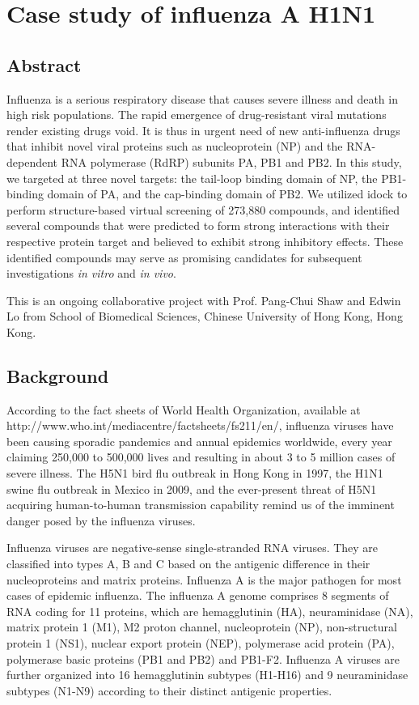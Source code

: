 \chapter{Case study of influenza A H1N1}
\label{influenza}

\section{Abstract}

Influenza is a serious respiratory disease that causes severe illness and death in high risk populations. The rapid emergence of drug-resistant viral mutations render existing drugs void. It is thus in urgent need of new anti-influenza drugs that inhibit novel viral proteins such as nucleoprotein (NP) and the RNA-dependent RNA polymerase (RdRP) subunits PA, PB1 and PB2. In this study, we targeted at three novel targets: the tail-loop binding domain of NP, the PB1-binding domain of PA, and the cap-binding domain of PB2. We utilized idock to perform structure-based virtual screening of 273,880 compounds, and identified several compounds that were predicted to form strong interactions with their respective protein target and believed to exhibit strong inhibitory effects. These identified compounds may serve as promising candidates for subsequent investigations \textit{in vitro} and \textit{in vivo}.

This is an ongoing collaborative project with Prof. Pang-Chui Shaw and Edwin Lo from School of Biomedical Sciences, Chinese University of Hong Kong, Hong Kong.

\section{Background}

According to the fact sheets of World Health Organization, available at http://www.who.int/mediacentre/factsheets/fs211/en/, influenza viruses have been causing sporadic pandemics and annual epidemics worldwide, every year claiming 250,000 to 500,000 lives and resulting in about 3 to 5 million cases of severe illness. The H5N1 bird flu outbreak in Hong Kong in 1997, the H1N1 swine flu outbreak in Mexico in 2009, and the ever-present threat of H5N1 acquiring human-to-human transmission capability remind us of the imminent danger posed by the influenza viruses.

Influenza viruses are negative-sense single-stranded RNA viruses. They are classified into types A, B and C based on the antigenic difference in their nucleoproteins and matrix proteins. Influenza A is the major pathogen for most cases of epidemic influenza. The influenza A genome comprises 8 segments of RNA coding for 11 proteins, which are hemagglutinin (HA), neuraminidase (NA), matrix protein 1 (M1), M2 proton channel, nucleoprotein (NP), non-structural protein 1 (NS1), nuclear export protein (NEP), polymerase acid protein (PA), polymerase basic proteins (PB1 and PB2) and PB1-F2. Influenza A viruses are further organized into 16 hemagglutinin subtypes (H1-H16) and 9 neuraminidase subtypes (N1-N9) according to their distinct antigenic properties.

